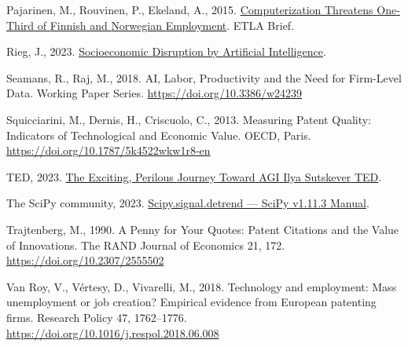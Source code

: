 \documentclass[
  12pt,
  a4paperpaper,
]{article}
\newlength{\cslhangindent}
\newenvironment{CSLReferences}[2] %
 {\begin{list}{}{%
  \setlength{\itemindent}{0pt}
  \setlength{\leftmargin}{0pt}
  \setlength{\parsep}{0pt}
  \ifodd #1
   \setlength{\leftmargin}{\cslhangindent}
   \setlength{\itemindent}{-1\cslhangindent}
  \fi
  \setlength{\itemsep}{#2\baselineskip}}}
 {\end{list}}
\begin{document}
\begin{CSLReferences}{1}{0}
Pajarinen, M., Rouvinen, P., Ekeland, A., 2015.
\href{https://ideas.repec.org//p/rif/briefs/34.html}{Computerization
{Threatens} {One}-{Third} of {Finnish} and {Norwegian} {Employment}}.
ETLA Brief.

Rieg, J., 2023. \href{https://github.com/Jonasrg/BT_AI}{Socioeconomic
{Disruption} by {Artificial} {Intelligence}}.

Seamans, R., Raj, M., 2018. {AI}, {Labor}, {Productivity} and the {Need}
for {Firm}-{Level} {Data}. Working {Paper} {Series}.
\url{https://doi.org/10.3386/w24239}

Squicciarini, M., Dernis, H., Criscuolo, C., 2013. Measuring {Patent}
{Quality}: {Indicators} of {Technological} and {Economic} {Value}. OECD,
Paris. \url{https://doi.org/10.1787/5k4522wkw1r8-en}

TED, 2023. \href{https://www.youtube.com/watch?v=SEkGLj0bwAU}{The
{Exciting}, {Perilous} {Journey} {Toward} {AGI} {\textbar} {Ilya}
{Sutskever} {\textbar} {TED}}.

The SciPy community, 2023.
\href{https://docs.scipy.org/doc/scipy/reference/generated/scipy.signal.detrend.html}{Scipy.signal.detrend
--- {SciPy} v1.11.3 {Manual}}.

Trajtenberg, M., 1990. A {Penny} for {Your} {Quotes}: {Patent}
{Citations} and the {Value} of {Innovations}. The RAND Journal of
Economics 21, 172. \url{https://doi.org/10.2307/2555502}

Van Roy, V., Vértesy, D., Vivarelli, M., 2018. Technology and
employment: {Mass} unemployment or job creation? {Empirical} evidence
from {European} patenting firms. Research Policy 47, 1762--1776.
\url{https://doi.org/10.1016/j.respol.2018.06.008}


\end{CSLReferences}
\end{document}
